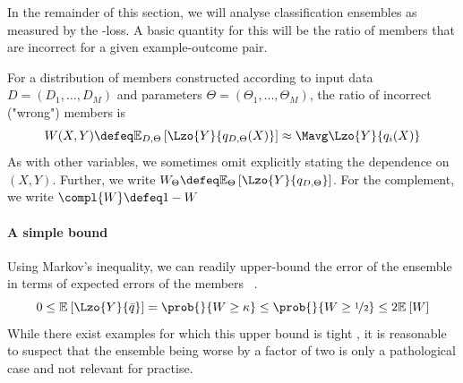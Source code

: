 \documentclass[../main.tex]{subfiles}
\begin{document}
In the remainder of this section, we will analyse classification ensembles as measured by the \zeroone-loss. 
A basic quantity for this will be the ratio of members that are incorrect for a given example-outcome pair.

\begin{definition}
For a distribution of members constructed according to input data $D = (D_{1}, \dots, D_{M})$ and parameters $\Theta = (\Theta_{1}, \dots, \Theta_{M})$, the ratio of incorrect ("wrong") members is
$$
W(X,Y) \defeq \mathbb{E}_{D, \Theta}\left[ \Lzo{Y}{q_{D, \Theta}(X)} \right] \approx \Mavg \Lzo{Y}{q_{i}(X)}
$$
As with other variables, we sometimes omit explicitly stating the dependence on $(X,Y)$. Further, we write $W_{\Theta} \defeq \mathbb{E}_{\Theta}\left[ \Lzo{Y}{q_{D, \Theta}} \right]$. For the complement, we write $\compl{W} \defeq 1 - W$
\end{definition}



\paragraph{A simple bound} Using Markov's inequality, we can readily upper-bound the error of the ensemble in terms of expected errors of the members~\cite{theisen_WhenAreEnsembles_2023}
.
$$
0 \leq \mathbb{E}_{}\left[ \Lzo{Y}{\bar{q}} \right] = \prob{}{W \geq \kappa} \leq \prob{}{W \geq \nicefrac{1}{2}} \leq 2 \mathbb{E}_{}\left[ W \right] 
$$
While there exist examples for which this upper bound is tight \cite{theisen_WhenAreEnsembles_2023}, it is reasonable to suspect that the ensemble being worse by a factor of two is only a pathological case and not relevant for practise.

\end{document}
